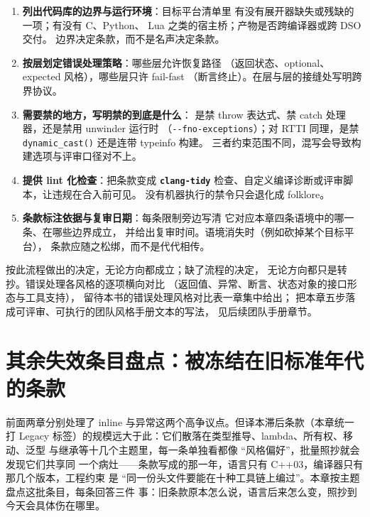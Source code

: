 \documentclass[12pt,a4paper,fontset=fandol]{ctexbook}
\newcommand{\cpp}[1]{C++#1}
\newcommand{\Fn}[1]{\texttt{#1()}}
\newcommand{\Opt}[1]{\texttt{-\/-#1}}
\newcommand{\Bk}{\discretionary{}{}{}}
\newcommand{\Lib}[1]{\textbf{\texttt{#1}}}
\newcommand{\Lang}[1]{\textsf{#1}}
\newcommand{\CL}{\Lang{C}}
\newcommand{\DomTra}{\Lang{Legacy}}
\begin{document}
\begin{bestpractice}[title={团队决策流程五步}]
\begin{enumerate}[label=(\arabic*)]
\item \textbf{列出代码库的边界与运行环境}：目标平台清单里
有没有展开器缺失或残缺的一项；有没有 \CL、\Lang{Python}、
\Lang{Lua} 之类的宿主桥；产物是否跨编译器或跨 DSO 交付。
边界决定条款，而不是名声决定条款。
\item \textbf{按层划定错误处理策略}：哪些层允许恢复路径
（返回状态、optional、expected 风格），哪些层只许 fail-fast
（断言终止）。在层与层的接缝处写明跨界协议。
\item \textbf{需要禁的地方，写明禁的到底是什么}：
是禁 throw 表达式、禁 catch 处理器，还是禁用 unwinder 运行时
（\Opt{fno-exceptions}）；对 RTTI 同理，是禁
\Fn{dynamic{\Bk}\_cast} 还是连带 typeinfo 构建。
三者约束范围不同，混写会导致构建选项与评审口径对不上。
\item \textbf{提供 lint 化检查}：把条款变成 \Lib{clang-tidy}
检查、自定义编译诊断或评审脚本，让违规在合入前可见。
没有机器执行的禁令只会退化成 folklore。
\item \textbf{条款标注依据与复审日期}：每条限制旁边写清
它对应本章四条语境中的哪一条、在哪些边界成立，
并给出复审时间。语境消失时（例如砍掉某个目标平台），
条款应随之松绑，而不是代代相传。
\end{enumerate}
\end{bestpractice}

按此流程做出的决定，无论方向都成立；缺了流程的决定，
无论方向都只是转抄。错误处理各风格的逐项横向对比
（返回值、异常、断言、状态对象的接口形态与工具支持），
留待本书的错误处理风格对比表一章集中给出；
把本章五步落成可评审、可执行的团队风格手册文本的写法，
见后续团队手册章节。


\chapter{其余失效条目盘点：被冻结在旧标准年代的条款}
\label{ch:ch12-stale}

前面两章分别处理了 inline 与异常这两个高争议点。但译本滞后条款（本章统一打
\DomTra{} 标签）的规模远大于此：它们散落在类型推导、lambda、所有权、移动、泛型
与继承等十几个主题里，每一条单独看都像 ``风格偏好''，批量照抄就会发现它们共享同
一个病灶——条款写成的那一年，语言只有 \cpp{03}，编译器只有那几个版本，工程约束
是 ``同一份头文件要能在十种工具链上编过''。本章按主题盘点这批条目，每条回答三件
事：旧条款原本怎么说，语言后来怎么变，照抄到今天会具体伤在哪里。
\end{document}
